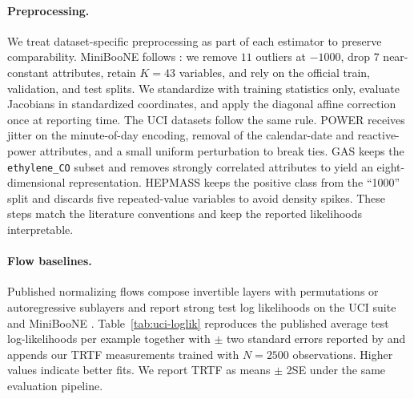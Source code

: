 \documentclass[11pt,a4paper,twoside]{book}\usepackage[]{graphicx}\usepackage[]{xcolor}
\begin{document}
\paragraph{Preprocessing.} We treat dataset-specific preprocessing as part of each estimator to preserve comparability. MiniBooNE follows \citet{papamakarios2017masked}: we remove $11$ outliers at $-1000$, drop $7$ near-constant attributes, retain $K=43$ variables, and rely on the official train, validation, and test splits. We standardize with training statistics only, evaluate Jacobians in standardized coordinates, and apply the diagonal affine correction once at reporting time. The UCI datasets follow the same rule. POWER receives jitter on the minute-of-day encoding, removal of the calendar-date and reactive-power attributes, and a small uniform perturbation to break ties. GAS keeps the \texttt{ethylene\_CO} subset and removes strongly correlated attributes to yield an eight-dimensional representation. HEPMASS keeps the positive class from the ``1000'' split and discards five repeated-value variables to avoid density spikes. These steps match the literature conventions and keep the reported likelihoods interpretable.

\paragraph{Flow baselines.} Published normalizing flows compose invertible layers with permutations or autoregressive sublayers and report strong test log likelihoods on the UCI suite and MiniBooNE \citep{rezende2015variational,dinh2017real,kingma2018glow,durkan2019neural,papamakarios2021normalizing}. Table~\ref{tab:uci-loglik} reproduces the published average test log-likelihoods per example together with $\pm$ two standard errors reported by \citet{papamakarios2017masked} and appends our TRTF measurements trained with $N=2500$ observations. Higher values indicate better fits. We report TRTF as means $\pm$ 2SE under the same evaluation pipeline.
\end{document}
